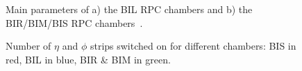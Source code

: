 \begin{figure}[!h]
	\centering	
	\caption{Main parameters of a) the BIL RPC chambers and b) the BIR/BIM/BIS RPC chambers~\cite{TDR}.}
	\label{fig:param}
\end{figure}	
\begin{figure}[!h]
	\centering	
	\caption{Number of $\eta$ and $\phi$ strips switched on for different chambers:  BIS in red, BIL in blue, BIR \& BIM in green.}
	\label{fig:strips_BI}
\end{figure}	
\FloatBarrier

